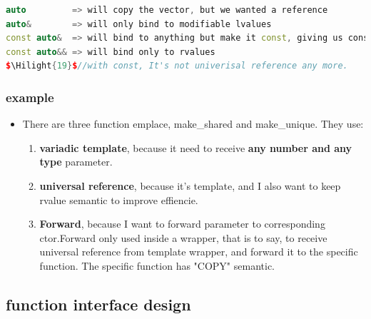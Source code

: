 \documentclass[a4paper,12pt,twoside]{book}
\newcommand{\Hilight}[1]{\makebox[0pt][l]{\color{yellow}\rule[-3pt]{#1em}{11pt}}}
\begin{document}
\begin{itemize}
\begin{enumerate}
\begin{lstlisting}[frame=single, language=c++]
auto         => will copy the vector, but we wanted a reference
auto&        => will only bind to modifiable lvalues
const auto&  => will bind to anything but make it const, giving us const_iterator
const auto&& => will bind only to rvalues
$\Hilight{19}$//with const, It's not univerisal reference any more.
\end{lstlisting} 
		\end{enumerate}

\end{itemize}

\subsubsection{example }
\begin{itemize}
\item There are three function emplace, make\_shared and make\_unique. They use:
		\begin{enumerate}
				\item \textbf{variadic template}, because it need to receive \textbf{any number and any type} parameter.
				
				\item \textbf{universal reference}, because it's template, and I also want to keep rvalue semantic to improve effiencie. 
				
				\item \textbf{Forward}, because I want to forward parameter to corresponding ctor.Forward only used inside a wrapper, that is to say, to receive universal reference from template wrapper, and forward it to the specific function. The specific function has "COPY" semantic. 
		\end{enumerate}
		
\end{itemize}


\subsection{function interface design}
\end{document}
